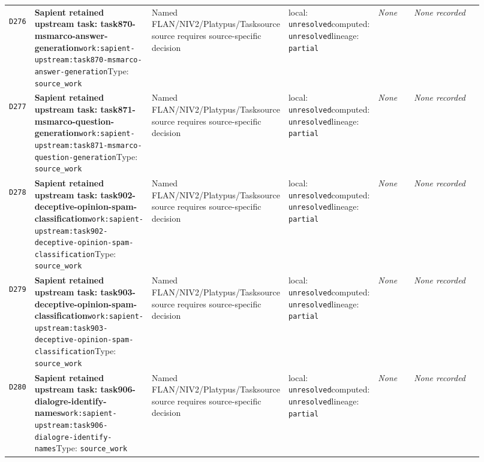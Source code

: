 \documentclass[9pt,a4paper]{article}
\newcommand{\depid}[1]{\hypertarget{dep:#1}{\texttt{#1}}}
\begin{document}
\begin{landscape}
\begin{longtable}{@{}L{0.035\linewidth}L{0.185\linewidth}L{0.27\linewidth}L{0.09\linewidth}L{0.10\linewidth}L{0.24\linewidth}@{}}
\depid{D276} & \textbf{Sapient retained upstream task: task870-msmarco-answer-generation}\newline \nolinkurl{work:sapient-upstream:task870-msmarco-answer-generation}\newline Type: \texttt{source\_work} & Named FLAN/NIV2/Platypus/Tasksource source requires source-specific decision & local: \texttt{unresolved}\newline computed: \texttt{unresolved}\newline lineage: \texttt{partial} & \textit{None} & \textit{None recorded} \\
\depid{D277} & \textbf{Sapient retained upstream task: task871-msmarco-question-generation}\newline \nolinkurl{work:sapient-upstream:task871-msmarco-question-generation}\newline Type: \texttt{source\_work} & Named FLAN/NIV2/Platypus/Tasksource source requires source-specific decision & local: \texttt{unresolved}\newline computed: \texttt{unresolved}\newline lineage: \texttt{partial} & \textit{None} & \textit{None recorded} \\
\depid{D278} & \textbf{Sapient retained upstream task: task902-deceptive-opinion-spam-classification}\newline \nolinkurl{work:sapient-upstream:task902-deceptive-opinion-spam-classification}\newline Type: \texttt{source\_work} & Named FLAN/NIV2/Platypus/Tasksource source requires source-specific decision & local: \texttt{unresolved}\newline computed: \texttt{unresolved}\newline lineage: \texttt{partial} & \textit{None} & \textit{None recorded} \\
\depid{D279} & \textbf{Sapient retained upstream task: task903-deceptive-opinion-spam-classification}\newline \nolinkurl{work:sapient-upstream:task903-deceptive-opinion-spam-classification}\newline Type: \texttt{source\_work} & Named FLAN/NIV2/Platypus/Tasksource source requires source-specific decision & local: \texttt{unresolved}\newline computed: \texttt{unresolved}\newline lineage: \texttt{partial} & \textit{None} & \textit{None recorded} \\
\depid{D280} & \textbf{Sapient retained upstream task: task906-dialogre-identify-names}\newline \nolinkurl{work:sapient-upstream:task906-dialogre-identify-names}\newline Type: \texttt{source\_work} & Named FLAN/NIV2/Platypus/Tasksource source requires source-specific decision & local: \texttt{unresolved}\newline computed: \texttt{unresolved}\newline lineage: \texttt{partial} & \textit{None} & \textit{None recorded} \\

\end{longtable}
\end{landscape}
\end{document}
